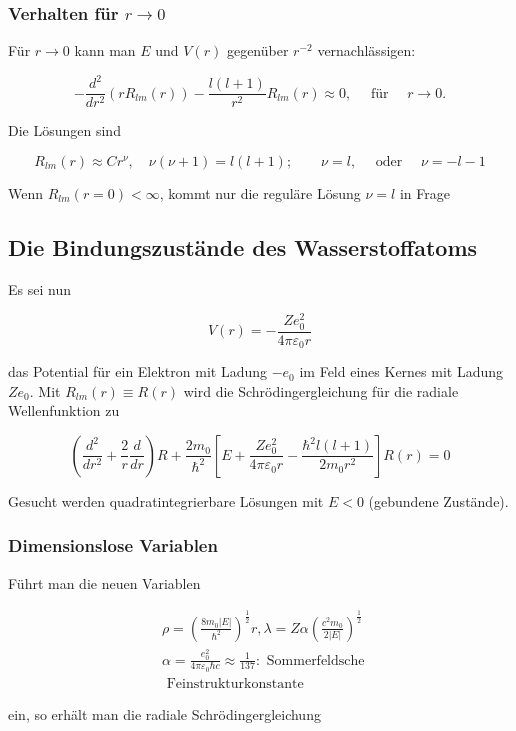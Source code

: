 \documentclass[10pt, letterpaper]{article}
\begin{document}
\subsubsection*{Verhalten für $r \rightarrow 0$}
Für $r \rightarrow 0$ kann man $E$ und $V(r)$ gegenüber $r^{-2}$ vernachlässigen:

$$
-\frac{d^{2}}{d r^{2}}\left(r R_{l m}(r)\right)-\frac{l(l+1)}{r^{2}} R_{l m}(r) \approx 0, \quad \text { für } \quad r \rightarrow 0 .
$$

Die Lösungen sind

$$
R_{l m}(r) \approx C r^{\nu}, \quad \nu(\nu+1)=l(l+1) ; \quad \quad \nu=l, \quad \text { oder } \quad \nu=-l-1
$$

Wenn $R_{l m}(r=0)<\infty$, kommt nur die reguläre Lösung $\nu=l$ in Frage

\subsection*{Die Bindungszustände des Wasserstoffatoms}
Es sei nun

$$
V(r)=-\frac{Z e_{0}^{2}}{4 \pi \varepsilon_{0} r}
$$

das Potential für ein Elektron mit Ladung $-e_{0}$ im Feld eines Kernes mit Ladung $Z e_{0}$. Mit $R_{l m}(r) \equiv R(r)$ wird die Schrödingergleichung für die radiale Wellenfunktion zu

$$
\left(\frac{d^{2}}{d r^{2}}+\frac{2}{r} \frac{d}{d r}\right) R+\frac{2 m_{0}}{\hbar^{2}}\left[E+\frac{Z e_{0}^{2}}{4 \pi \varepsilon_{0} r}-\frac{\hbar^{2} l(l+1)}{2 m_{0} r^{2}}\right] R(r)=0
$$

Gesucht werden quadratintegrierbare Lösungen mit $E<0$ (gebundene Zustände).

\subsubsection*{Dimensionslose Variablen}
Führt man die neuen Variablen

$$
\begin{aligned}
& \rho=\left(\frac{8 m_{0}|E|}{\hbar^{2}}\right)^{\frac{1}{2}} r, \lambda=Z \alpha\left(\frac{c^{2} m_{0}}{2|E|}\right)^{\frac{1}{2}} \\
& \alpha=\frac{e_{0}^{2}}{4 \pi \varepsilon_{0} \hbar c} \approx \frac{1}{137}: \text { Sommerfeldsche } \\
& \text { Feinstrukturkonstante }
\end{aligned}
$$

ein, so erhält man die radiale Schrödingergleichung
\end{document}
